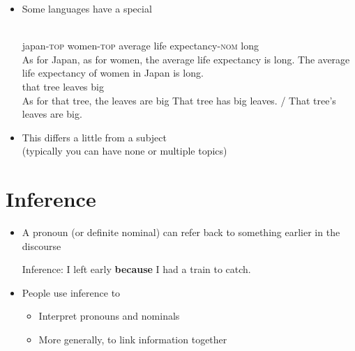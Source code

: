 \documentclass[headrule,footrule]{foils}
\begin{document}
\begin{itemize}
\item Some languages have a special 
  \begin{exe} %
    \ex \gll {}     \\
    japan-\textsc{top} women-\textsc{top} {average} {life expectancy}-\textsc{nom}
    long \\
    \trans As for Japan, as for women, the average life expectancy is long.
    \trans The average life expectancy of women in Japan is long.
    \ex \gll {}   {}   \\
    that tree {} leaves big \\
    \trans As for that tree, the leaves are big
    \trans That tree has big leaves. / That tree's leaves are big.
  \end{exe}
\item This differs a little from a subject 
  \\ (typically you can have none or multiple topics)
\end{itemize}

\section{Inference}

\begin{itemize}
\item A pronoun (or definite nominal) can refer back to something
  earlier in the discourse
  \begin{exe}
    \ex 
    \begin{xlist}
    \ex {} \hfill {}
    \ex {} \hfill {}
    \ex {} \hfill {}
    \ex {} \hfill {}
    \ex {} \hfill {}
  \end{xlist}
  \ex 
 \begin{xlist}
   \ex {}
   \trans \textnormal{Inference: I left early \textbf{because} I had a train to catch.}
 \end{xlist}
\end{exe}
\item People use inference to 
  \begin{itemize}
  \item Interpret pronouns and nominals
  \item More generally, to link information together
  \end{itemize}
\end{itemize}
 
\end{document}
